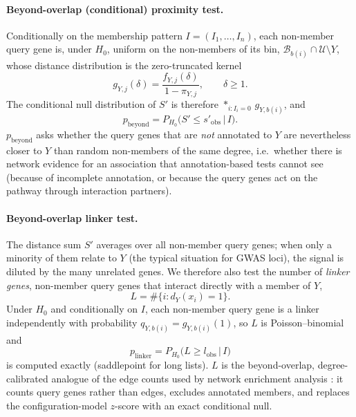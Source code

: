\paragraph{Beyond-overlap (conditional) proximity test.} Conditionally on the membership pattern $I = (I_1, \dots, I_n)$, each non-member query gene is, under $H_0$, uniform on the non-members of its bin, $\mathcal{B}_{b(i)} \cap \mathcal{U} \setminus Y$, whose distance distribution is the zero-truncated kernel
\begin{equation}
g_{Y,j}(\delta) = \frac{f_{Y,j}(\delta)}{1 - \pi_{Y,j}}, \qquad \delta \ge 1 .
\end{equation}
The conditional null distribution of $S'$ is therefore $\ast_{i: I_i = 0}\, g_{Y, b(i)}$, and
\begin{equation}
p_{\mathrm{beyond}} = P_{H_0}\big(S' \le s'_{\mathrm{obs}} \,\big|\, I\big).
\end{equation}
$p_{\mathrm{beyond}}$ asks whether the query genes that are \emph{not} annotated to $Y$ are nevertheless closer to $Y$ than random non-members of the same degree, i.e.\ whether there is network evidence for an association that annotation-based tests cannot see (because of incomplete annotation, or because the query genes act on the pathway through interaction partners).

\paragraph{Beyond-overlap linker test.} The distance sum $S'$ averages over all non-member query genes; when only a minority of them relate to $Y$ (the typical situation for GWAS loci), the signal is diluted by the many unrelated genes. We therefore also test the number of \emph{linker genes}, non-member query genes that interact directly with a member of $Y$,
\begin{equation}
L = \#\{i : d_Y(x_i) = 1\}.
\end{equation}
Under $H_0$ and conditionally on $I$, each non-member query gene is a linker independently with probability $q_{Y,b(i)} = g_{Y,b(i)}(1)$, so $L$ is Poisson--binomial and
\begin{equation}
p_{\mathrm{linker}} = P_{H_0}\big(L \ge l_{\mathrm{obs}} \,\big|\, I\big)
\end{equation}
is computed exactly (saddlepoint for long lists). $L$ is the beyond-overlap, degree-calibrated analogue of the edge counts used by network enrichment analysis \citep{Alexeyenko2012}: it counts query genes rather than edges, excludes annotated members, and replaces the configuration-model $z$-score with an exact conditional null.

